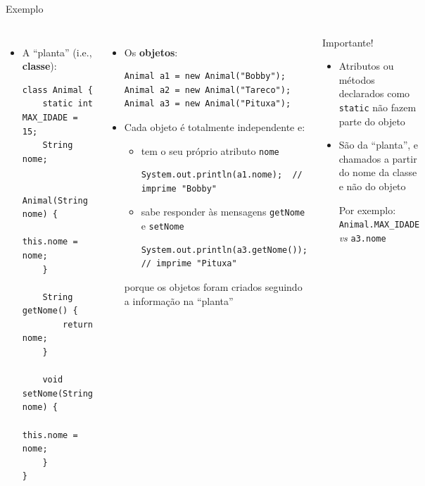 \documentclass[portuguese, aspectratio=169, xcolor=table]{beamer}
\begin{document}
\begin{frame}[fragile]{Exemplo}
\scriptsize
\begin{columns}
\begin{itemize}
    \item A ``planta'' (i.e., \textbf{classe}):
\begin{verbatim}
class Animal {
    static int MAX_IDADE = 15;
    String nome;
    
    Animal(String nome) {
        this.nome = nome;
    }

    String getNome() {
        return nome;
    }

    void setNome(String nome) {
        this.nome = nome;
    }
}
\end{verbatim}
\end{itemize}
\begin{itemize}
\item Os \textbf{objetos}:
\begin{verbatim}
Animal a1 = new Animal("Bobby");
Animal a2 = new Animal("Tareco");
Animal a3 = new Animal("Pituxa");
\end{verbatim}
\item Cada objeto é totalmente independente e:
\begin{itemize}
    \scriptsize
    \item tem o seu próprio atributo \texttt{nome}
\begin{verbatim}
System.out.println(a1.nome);  // imprime "Bobby"
\end{verbatim}
\item sabe responder às mensagens \texttt{getNome} e \texttt{setNome}\begin{verbatim}
System.out.println(a3.getNome());  // imprime "Pituxa"
\end{verbatim}
\end{itemize} 
porque os objetos foram criados seguindo a informação na ``planta''
\end{itemize}
\vfill

\begin{alertblock}{Importante!}
 \begin{itemize}
     \item Atributos ou métodos declarados como \texttt{static} não fazem parte do objeto
     \item São da ``planta'', e chamados a partir do nome da classe e não do objeto
     
     Por exemplo: \texttt{Animal.MAX_IDADE}  \textit{vs} \texttt{a3.nome}
 \end{itemize}
\end{alertblock}
\end{columns}
\end{frame}
\end{document}
